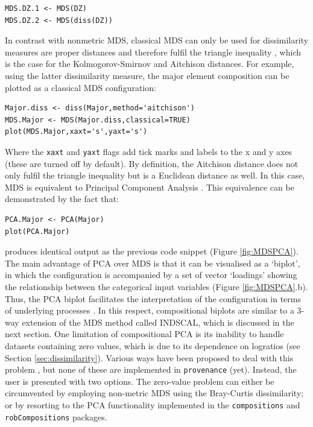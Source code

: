 \documentclass{article}
\begin{document}
\begin{verbatim}
MDS.DZ.1 <- MDS(DZ)
MDS.DZ.2 <- MDS(diss(DZ))
\end{verbatim}

In contrast with nonmetric MDS, classical MDS can only be used for
dissimilarity measures are proper distances and therefore fulfil the
triangle inequality \citep{borg2005}, which is the case for the
Kolmogorov-Smirnov and Aitchison distances. For example, using the
latter dissimilarity measure, the major element composition can be
plotted as a classical MDS configuration:

\begin{verbatim}
Major.diss <- diss(Major,method='aitchison')
MDS.Major <- MDS(Major.diss,classical=TRUE)
plot(MDS.Major,xaxt='s',yaxt='s')
\end{verbatim}

Where the {\tt xaxt} and {\tt yaxt} flags add tick marks and labels to
the x and y axes (these are turned off by default). By definition, the
Aitchison distance does not only fulfil the triangle inequality but is
a Euclidean distance as well. In this case, MDS is equivalent to
Principal Component Analysis \citep[PCA,][]{aitchison1983, cox2000}.
This equivalence can be demonstrated by the fact that:

\begin{verbatim}
PCA.Major <- PCA(Major)
plot(PCA.Major)
\end{verbatim}

produces identical output as the previous code snippet (Figure
\ref{fig:MDSPCA}). The main advantage of PCA over MDS is that it can
be visualised as a `biplot', in which the configuration is accompanied
by a set of vector `loadings' showing the relationship between the
categorical input variables (Figure \ref{fig:MDSPCA}.b). Thus, the PCA
biplot facilitates the interpretation of the configuration in terms of
underlying processes \citep{aitchison2002}.  In this respect,
compositional biplots are similar to a 3-way extension of the MDS
method called INDSCAL, which is discussed in the next section. One
limitation of compositional PCA is its inability to handle datasets
containing zero values, which is due to its dependence on logratios
(see Section \ref{sec:dissimilarity}). Various ways have been proposed
to deal with this problem \citep[e.g.,][]{martin2003}, but none of
these are implemented in {\tt provenance} (yet).  Instead, the user is
presented with two options. The zero-value problem can either be
circumvented by employing non-metric MDS using the Bray-Curtis
dissimilarity; or by resorting to the PCA functionality implemented in
the {\tt compositions} and {\tt robCompositions} packages.
\end{document}
